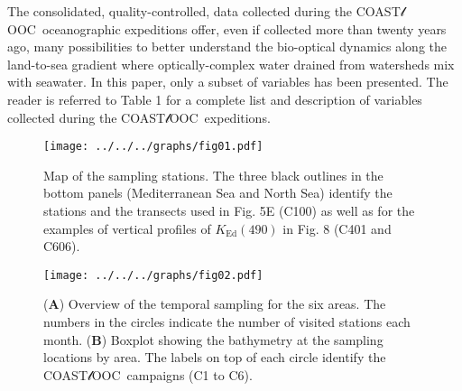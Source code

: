 \documentclass[essd, manuscript]{copernicus}
\newcommand{\coastlooc}{COAST$\mathscr{l}$OOC~\allowbreak}
\begin{document}
\conclusions  %

The consolidated, quality-controlled, data collected during the \coastlooc oceanographic expeditions offer, even if collected more than twenty years ago, many possibilities to better understand the bio-optical dynamics along the land-to-sea gradient where optically-complex water drained from watersheds mix with seawater. In this paper, only a subset of variables has been presented. The reader is referred to Table 1 for a complete list and description of variables collected during the \coastlooc expeditions.






\begin{figure}[t]
    \texttt{[image: ../../../graphs/fig01.pdf]}
    \caption{Map of the sampling stations. The three black outlines in the bottom panels (Mediterranean Sea and North Sea) identify the stations and the transects used in Fig. 5E (C100) as well as for the examples of vertical profiles of $K_{\text{Ed}}(490)$ in Fig. 8 (C401 and C606).}
\end{figure}

\clearpage

\begin{figure}[t]
    \texttt{[image: ../../../graphs/fig02.pdf]}
    \caption{(\textbf{A}) Overview of the temporal sampling for the six areas. The numbers in the circles indicate the number of visited stations each month. (\textbf{B}) Boxplot showing the bathymetry at the sampling locations by area. The labels on top of each circle identify the \coastlooc campaigns (C1 to C6).}
\end{figure}

\clearpage
\end{document}
